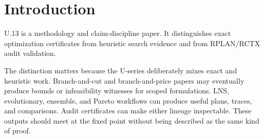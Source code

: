 \section{Introduction}

U.13 is a methodology and claim-discipline paper. It distinguishes exact
optimization certificates from heuristic search evidence and from RPLAN/RCTX
audit validation.

The distinction matters because the U-series deliberately mixes exact and
heuristic work. Branch-and-cut and branch-and-price papers may eventually
produce bounds or infeasibility witnesses for scoped formulations. LNS,
evolutionary, ensemble, and Pareto workflows can produce useful plans, traces,
and comparisons. Audit certificates can make either lineage inspectable. These
outputs should meet at the fixed point without being described as the same kind
of proof.
